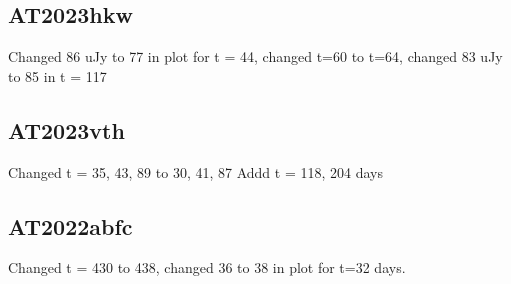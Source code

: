\documentclass[twocolumn,twocolappendix]{aastex631}
\begin{document}
\subsection{AT2023hkw}
Changed 86 uJy to 77 in plot for t = 44, changed t=60 to t=64, changed 83 uJy to 85 in t = 117

\subsection{AT2023vth}
Changed t = 35, 43, 89 to 30, 41, 87
Addd t = 118, 204 days

\subsection{AT2022abfc}
Changed t = 430 to 438, changed 36 to 38 in plot for t=32 days.






\end{document}
